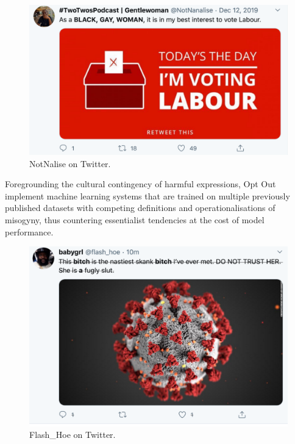\begin{figure}[!ht]
  \centering
  \includegraphics[scale=0.5]{Notnalise.png}
  \caption{NotNalise on Twitter.}
  \label{fig:notnalise}
\end{figure}

Foregrounding the cultural contingency of harmful expressions, Opt Out implement machine learning systems that are trained on multiple previously published datasets with competing definitions and operationalisations of misogyny, thus countering essentialist tendencies at the cost of model performance.

\begin{figure}[!ht]
  \centering
  \includegraphics[scale=0.5]{Rona.png}
  \caption{Flash\_Hoe on Twitter.}
  \label{fig:flash_hoe}
\end{figure}

